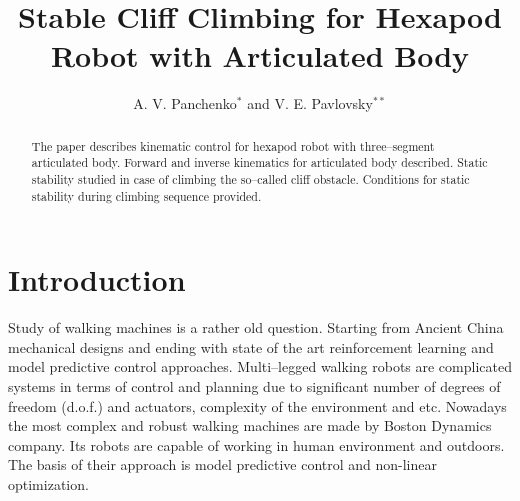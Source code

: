 \documentclass{ws-procs9x6}
\begin{document}
\title{Stable Cliff Climbing for Hexapod Robot with Articulated Body}

\author{A. V. Panchenko$^*$ and V. E. Pavlovsky$^{**}$}

\address{Faculty of Mechanics and Mathematics, Lomonosov Moscow State University,\\
Moscow, 119991, Russia\\
$^*$E-mail: PanchenkoAV@vap.ru\\
$^{**}$E-mail: vlpavl@mail.ru}

\begin{abstract}
The paper describes kinematic control for hexapod robot with three--segment articulated body. Forward and inverse kinematics for articulated body described. Static stability studied in case of climbing the so--called cliff obstacle. Conditions for static stability during climbing sequence provided.
\end{abstract}


\bodymatter

\section{Introduction}\label{aba:intoduction}
Study of walking machines is a rather old question. Starting from 
Ancient China mechanical designs\cite{yan2005historical} and ending with state of the art reinforcement learning \cite{peng2017deeploco} and model predictive control approaches\cite{diedam2008online}. Multi--legged walking robots are complicated systems in terms of control and planning due to significant number of degrees of freedom (d.o.f.) and actuators, complexity of the environment and etc. Nowadays the most complex and robust walking machines are made by Boston Dynamics company\cite{raibert2008bigdog}. Its robots are capable of working in human environment and outdoors. The basis of their approach is model predictive control and non-linear optimization. 

\end{document}
